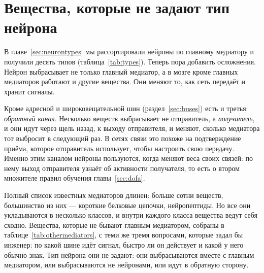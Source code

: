 \chapter{Вещества, которые не задают тип нейрона}
\label{sec:othermediators}

В главе~\ref{sec:neurontypes} мы рассортировали нейроны по главному медиатору и получили десять типов (таблица~\ref{tab:types}). Теперь пора добавить осложнения. Нейрон выбрасывает не только главный медиатор, а в мозге кроме главных медиаторов работают и другие вещества. Они меняют то, как сеть передаёт и хранит сигналы.

Кроме адресной и широковещательной шин (раздел~\ref{sec:buses}) есть и третья: \emph{обратный канал}. Несколько веществ выбрасывает не отправитель, а \emph{получатель}, и они идут через щель назад, к выходу отправителя, и меняют, сколько медиатора тот выбросит в следующий раз. В сетях связи это похоже на подтверждение приёма, которое отправитель использует, чтобы настроить свою передачу. Именно этим каналом нейроны пользуются, когда меняют веса своих связей: по нему выход отправителя узнаёт об активности получателя, то есть о втором множителе правил обучения главы~\ref{sec:dofa}.

Полный список известных медиаторов длинен: больше сотни веществ, большинство из них --- короткие белковые цепочки, нейропептиды. Но все они укладываются в несколько классов, и внутри каждого класса вещества ведут себя сходно. Вещества, которые не бывают главным медиатором, собраны в таблице~\ref{tab:othermediators}, с теми же тремя вопросами, которые задал бы инженер: по какой шине идёт сигнал, быстро ли он действует и какой у него обычно знак. Тип нейрона они не задают: они выбрасываются вместе с главным медиатором, или выбрасываются не нейронами, или идут в обратную сторону.


